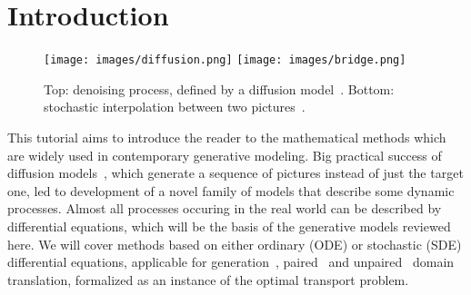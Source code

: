 \section{Introduction}
\begin{figure}[h]
\centering
\texttt{[image: images/diffusion.png]}
\texttt{[image: images/bridge.png]}
\caption{Top: denoising process, defined by a diffusion model~\cite{song2020score}. Bottom: stochastic interpolation between two pictures~\cite{albergo2023stochastic}.}
\end{figure}

This tutorial aims to introduce the reader to the mathematical methods which are widely used in contemporary generative modeling. Big practical success of diffusion models~\cite{ho2020denoising, de2021diffusion, song2020score}, which generate a sequence of pictures instead of just the target one, led to development of a novel family of models that describe some dynamic processes. Almost all processes occuring in the real world can be described by differential equations, which will be the basis of the generative models reviewed here. We will cover methods based on either ordinary (ODE) or stochastic (SDE) differential equations, applicable for generation~\cite{song2020score, lipman2022flow, tong2023conditional, albergo2022building, albergo2023stochastic}, paired~\cite{tong2023conditional, albergo2022building, albergo2023stochastic, liu20232} and unpaired~\cite{liu2022flow, shi2023diffusion, korotin2022neural, gushchin2022entropic} domain translation, formalized as an instance of the optimal transport problem.
